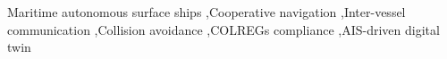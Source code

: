 \documentclass[final,5p,times,twocolumn]{elsarticle}
\begin{document}
\begin{frontmatter}
\begin{abstract}
{%


}
\end{abstract}

\begin{keyword}
Maritime autonomous surface ships \sep Cooperative navigation \sep Inter-vessel communication \sep Collision avoidance \sep COLREGs compliance \sep AIS-driven digital twin
\end{keyword}

\end{frontmatter}
\end{document}
